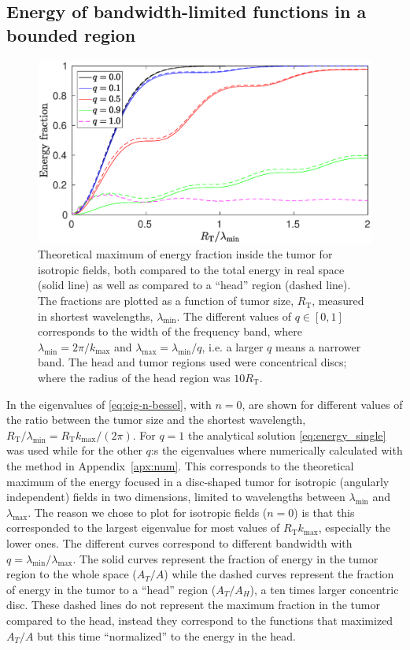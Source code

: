 \documentclass[11pt,a4paper, 
swedish,english %
]{article}
\newcommand{\RT}{\ensuremath{R_{\text{T}}}}
\begin{document}
\subsection{Energy of bandwidth-limited functions in a bounded region}
\begin{figure}\centering
\centerline{ %
\includegraphics[width=16cm]{ring_both_L1000.eps}
}
\caption{Theoretical maximum of energy fraction inside the tumor for isotropic 
  fields, both compared to the total energy in real space (solid line) as well as
  compared to a ``head'' region (dashed line). The fractions are plotted as
  a function of tumor size, $\RT$, measured in shortest wavelengths,
  $\lambda_{\min}$. The different values of $q\in[0, 1]$ corresponds to 
  the width of the frequency band, where $\lambda_{\min}=2\pi/k_{\max}$ and
  $\lambda_{\max}=\lambda_{\min}/q$, i.e. a larger $q$
  means a narrower band. The head and tumor regions used were concentrical discs;
  where the radius of the head region was $10\RT$. }
\label{fig:both}
\end{figure}

In  the eigenvalues of \eqref{eq:eig-n-bessel}, with $n=0$, are shown 
for different values of the ratio between the tumor size and the shortest wavelength, $\RT/\lambda_{\min}=\RT{k_{\max}}/(2\pi)$. For $q=1$ the analytical solution \eqref{eq:energy_single} was used while for the other $q$:s the eigenvalues where numerically calculated with the method in Appendix~\ref{apx:num}.
This corresponds to the theoretical maximum of the energy focused in a disc-shaped tumor for isotropic (angularly independent) fields in two dimensions, limited to wavelengths between $\lambda_{\min}$ and $\lambda_{\max}$.
The reason we chose to plot for isotropic fields ($n=0$) is that this corresponded to the largest eigenvalue for most values of $\RT k_{\max}$, especially the lower ones.
The different curves correspond to different bandwidth with $q=\lambda_{\min}/\lambda_{\max}$. The solid curves represent the fraction of energy in the tumor region to the whole space ($A_T/A$) while the dashed curves represent the fraction of energy in the tumor to a ``head'' region ($A_T/A_H$), a ten times larger concentric disc. These dashed lines do not represent the maximum fraction in the tumor compared to the head, instead they correspond to the functions that maximized $A_T/A$ but this time ``normalized''  to the energy in the head.
\end{document}
